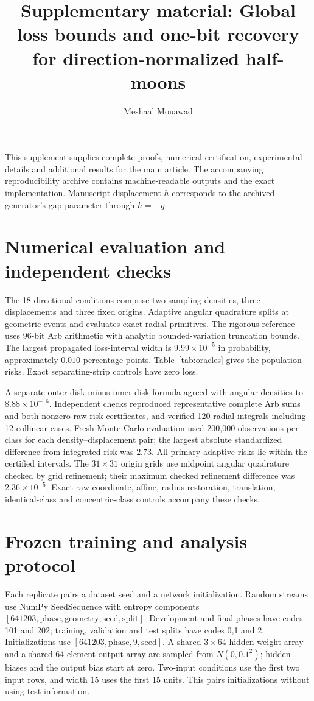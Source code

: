 \documentclass[10 pt,a 4 paper]{article}
\title{Supplementary material: Global loss bounds and one-bit recovery for direction-normalized half-moons}
\author{Meshaal Mouawad}
\date{}
\begin{document}
\maketitle
\noindent This supplement supplies complete proofs, numerical certification, experimental details and additional results for the main article. The accompanying reproducibility archive contains machine-readable outputs and the exact implementation. Manuscript displacement $h$ corresponds to the archived generator's gap parameter through $h=-g$.




\section{Numerical evaluation and independent checks}
The 18 directional conditions comprise two sampling densities, three displacements and three fixed origins. Adaptive angular quadrature splits at geometric events and evaluates exact radial primitives. The rigorous reference uses 96-bit Arb arithmetic with analytic bounded-variation truncation bounds. The largest propagated loss-interval width is $9.99\times 10^{-5}$ in probability, approximately $0.010$ percentage points. Table~\ref{tab:oracles} gives the population risks. Exact separating-strip controls have zero loss.

A separate outer-disk-minus-inner-disk formula agreed with angular densities to $8.88\times 10^{-16}$. Independent checks reproduced representative complete Arb sums and both nonzero raw-risk certificates, and verified 120 radial integrals including 12 collinear cases. Fresh Monte Carlo evaluation used 200,000 observations per class for each density--displacement pair; the largest absolute standardized difference from integrated risk was $2.73$. All primary adaptive risks lie within the certified intervals. The $31\times 31$ origin grids use midpoint angular quadrature checked by grid refinement; their maximum checked refinement difference was $2.36\times 10^{-5}$. Exact raw-coordinate, affine, radius-restoration, translation, identical-class and concentric-class controls accompany these checks.

\section{Frozen training and analysis protocol}
Each replicate pairs a dataset seed and a network initialization. Random streams use NumPy SeedSequence with entropy components $[641203,\mathrm{phase},\mathrm{geometry},\mathrm{seed},\mathrm{split}]$. Development and final phases have codes 101 and 202; training, validation and test splits have codes 0,1 and 2. Initializations use $[641203,\mathrm{phase},9,\mathrm{seed}]$. A shared $3\times 64$ hidden-weight array and a shared 64-element output array are sampled from $N(0,0.1^2)$; hidden biases and the output bias start at zero. Two-input conditions use the first two input rows, and width 15 uses the first 15 units. This pairs initializations without using test information.
\end{document}
